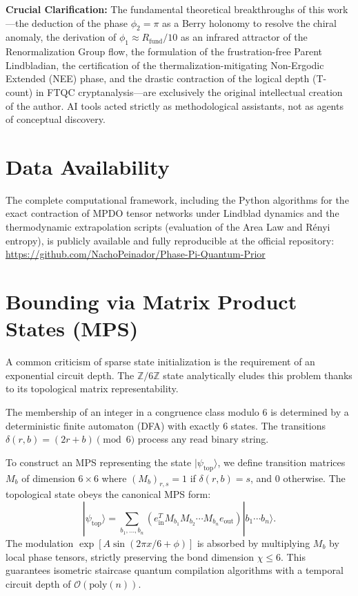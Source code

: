 \documentclass[reprint,aps,pra,superscriptaddress,nofootinbib]{revtex4-2}
\theoremstyle{plain}
\theoremstyle{definition}
\theoremstyle{remark}
\begin{document}
\begin{acknowledgments}
\textbf{Crucial Clarification:} The fundamental theoretical breakthroughs of this work—the deduction of the phase $\phi_2 = \pi$ as a Berry holonomy to resolve the chiral anomaly, the derivation of $\phi_1 \approx R_{\text{fund}}/10$ as an infrared attractor of the Renormalization Group flow, the formulation of the frustration-free Parent Lindbladian, the certification of the thermalization-mitigating Non-Ergodic Extended (NEE) phase, and the drastic contraction of the logical depth (T-count) in FTQC cryptanalysis—are exclusively the original intellectual creation of the author. AI tools acted strictly as methodological assistants, not as agents of conceptual discovery.
\end{acknowledgments}

\section*{Data Availability}
The complete computational framework, including the Python algorithms for the exact contraction of MPDO tensor networks under Lindblad dynamics and the thermodynamic extrapolation scripts (evaluation of the Area Law and Rényi entropy), is publicly available and fully reproducible at the official repository: \url{https://github.com/NachoPeinador/Phase-Pi-Quantum-Prior}




\appendix

\section{Bounding via Matrix Product States (MPS)}
\label{app:mps}

A common criticism of sparse state initialization is the requirement of an exponential circuit depth. The $\mathbb{Z}/6\mathbb{Z}$ state analytically eludes this problem thanks to its topological matrix representability.

The membership of an integer in a congruence class modulo $6$ is determined by a deterministic finite automaton (DFA) with exactly $6$ states. The transitions $\delta(r,b) = (2r+b) \pmod 6$ process any read binary string.

To construct an MPS representing the state $|\psi_{\text{top}}\rangle$, we define transition matrices $M_b$ of dimension $6\times 6$ where $(M_b)_{r,s} = 1$ if $\delta(r,b) = s$, and $0$ otherwise. The topological state obeys the canonical MPS form:
\begin{equation}
|\psi_{\text{top}}\rangle = \sum_{b_1,\dots,b_n} \left( e_{\text{in}}^T M_{b_1} M_{b_2} \cdots M_{b_n} e_{\text{out}} \right) |b_1\cdots b_n\rangle.
\end{equation}
The modulation $\exp[A\sin(2\pi x/6 + \phi)]$ is absorbed by multiplying $M_b$ by local phase tensors, strictly preserving the bond dimension $\chi \le 6$. This guarantees isometric staircase quantum compilation algorithms with a temporal circuit depth of $\mathcal{O}(\text{poly}(n))$.
\end{document}
